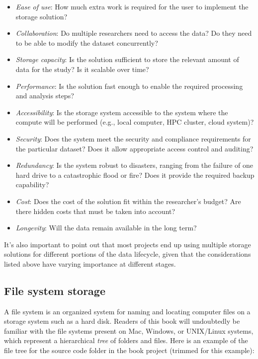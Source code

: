 \begin{itemize}
\item \textit{Ease of use}: How much extra work is required for the user to implement the storage solution?
\item \textit{Collaboration}: Do multiple researchers need to access the data? Do they need to be able to modify the dataset concurrently?
\item \textit{Storage capacity}: Is the solution sufficient to store the relevant amount of data for the study?  Is it scalable over time?
\item \textit{Performance}: Is the solution fast enough to enable the required processing and analysis steps?
\item \textit{Accessibility}: Is the storage system accessible to the system where the compute will be performed (e.g., local computer, HPC cluster, cloud system)?
\item \textit{Security}: Does the system meet the security and compliance requirements for the particular dataset? Does it allow appropriate access control and auditing?
\item \textit{Redundancy}: Is the system robust to disasters, ranging from the failure of one hard drive to a catastrophic flood or fire?  Does it provide the required backup capability?
\item \textit{Cost}: Does the cost of the solution fit within the researcher's budget?  Are there hidden costs that must be taken into account?
\item \textit{Longevity}: Will the data remain available in the long term?
\end{itemize}

It's also important to point out that most projects end up using multiple storage solutions for different portions of the data lifecycle, given that the considerations listed above have varying importance at different stages.

\subsection{File system storage}

A file system is an organized system for naming and locating computer files on a storage system such as a hard disk.  Readers of this book will undoubtedly be familiar with the file systems present on Mac, Windows, or UNIX/Linux systems, which represent a hierarchical \textit{tree} of folders and files. Here is an example of the file tree for the source code folder in the book project (trimmed for this example):

